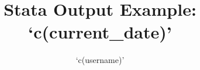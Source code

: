 \documentclass[12pt,oneside,final,letterpaper]{article}
\title{Stata Output Example: \\ `c(current_date)'}
\author{`c(username)'}
\begin{document}
\begin{titlepage} \maketitle \end{titlepage}
\newpage\clearpage \tableofcontents \newpage\clearpage
\listoffigures \newpage\clearpage
\listoftables \newpage\clearpage


\end{document}
